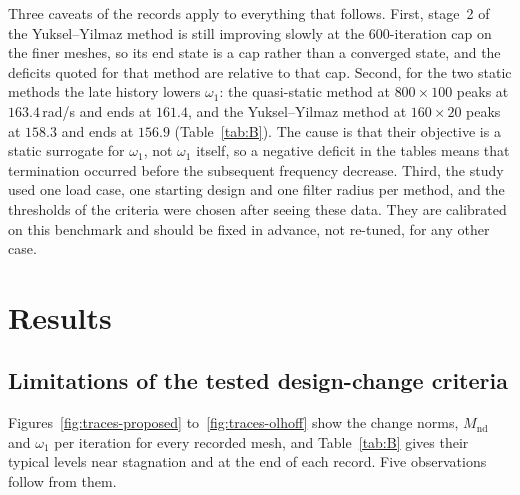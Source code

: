 \documentclass[11pt,a4paper]{article}
\newcommand{\Mnd}{M_{\mathrm{nd}}}
\newcommand{\me}[2]{$#1\times#2$}
\begin{document}
Three caveats of the records apply to everything that follows. First, stage~2 of the Yuksel--Yilmaz method is still improving slowly at the 600-iteration cap on the finer meshes, so its end state is a cap rather than a converged state, and the deficits quoted for that method are relative to that cap. Second, for the two static methods the late history lowers $\omega_1$: the quasi-static method at \me{800}{100} peaks at $163.4$\,rad/s and ends at $161.4$, and the Yuksel--Yilmaz method at \me{160}{20} peaks at $158.3$ and ends at $156.9$ (Table~\ref{tab:B}). The cause is that their objective is a static surrogate for $\omega_1$, not $\omega_1$ itself, so a negative deficit in the tables means that termination occurred before the subsequent frequency decrease. Third, the study used one load case, one starting design and one filter radius per method, and the thresholds of the criteria were chosen after seeing these data. They are calibrated on this benchmark and should be fixed in advance, not re-tuned, for any other case.

\section{Results}
\label{sec:results}

\subsection{Limitations of the tested design-change criteria}
\label{sec:diagnosis}

Figures~\ref{fig:traces-proposed} to~\ref{fig:traces-olhoff} show the change norms, $\Mnd$ and $\omega_1$ per iteration for every recorded mesh, and Table~\ref{tab:B} gives their typical levels near stagnation and at the end of each record. Five observations follow from them.
\end{document}
